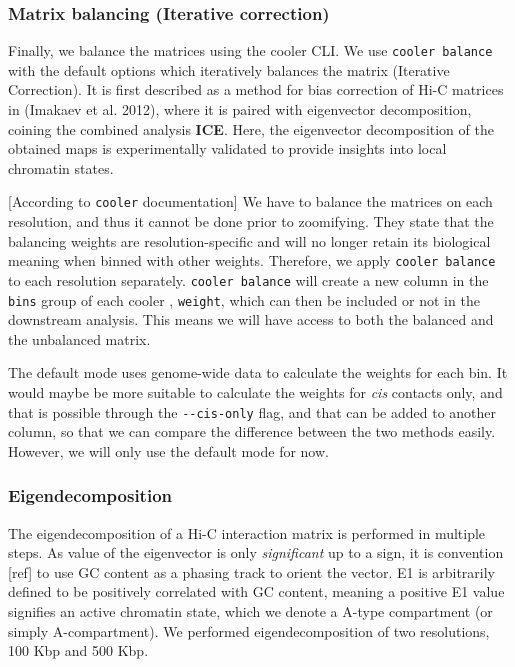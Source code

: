 \documentclass[
  a4paper,
]{scrbook}
\let\oldemph\emph
\renewcommand\emph[1]{\oldemph{\color{gray}#1}}
\begin{document}
\subsubsection{Matrix balancing (Iterative
correction)}\label{matrix-balancing-iterative-correction}

Finally, we balance the matrices using the cooler CLI. We use
\texttt{cooler\ balance} with the default options which iteratively
balances the matrix (Iterative Correction). It is first described as a
method for bias correction of Hi-C matrices in (Imakaev et al. 2012),
where it is paired with eigenvector decomposition, coining the combined
analysis \textbf{ICE}. Here, the eigenvector decomposition of the
obtained maps is experimentally validated to provide insights into local
chromatin states.

{[}According to \texttt{cooler} documentation{]} We have to balance the
matrices on each resolution, and thus it cannot be done prior to
zoomifying. They state that the balancing weights are
resolution-specific and will no longer retain its biological meaning
when binned with other weights. Therefore, we apply
\texttt{cooler\ balance} to each resolution separately.
\texttt{cooler\ balance} will create a new column in the \texttt{bins}
group of each cooler , \texttt{weight}, which can then be included or
not in the downstream analysis. This means we will have access to both
the balanced and the unbalanced matrix.

The default mode uses genome-wide data to calculate the weights for each
bin. It would maybe be more suitable to calculate the weights for
\emph{cis} contacts only, and that is possible through the
\texttt{-\/-cis-only} flag, and that can be added to another column, so
that we can compare the difference between the two methods easily.
However, we will only use the default mode for now.

\subsubsection{Eigendecomposition}\label{eigendecomposition}

The eigendecomposition of a Hi-C interaction matrix is performed in
multiple steps. As value of the eigenvector is only \emph{significant}
up to a sign, it is convention {[}ref{]} to use GC content as a phasing
track to orient the vector. E1 is arbitrarily defined to be positively
correlated with GC content, meaning a positive E1 value signifies an
active chromatin state, which we denote a A-type compartment (or simply
A-compartment). We performed eigendecomposition of two resolutions, 100
Kbp and 500 Kbp.
\end{document}
